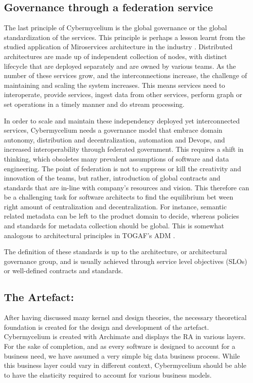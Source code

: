 \documentclass[review]{elsarticle}
\begin{document}
\subsection{Governance through a federation service}

The last principle of Cybermycelium is the global governance or the global standardization of the services. This principle is perhaps a lesson learnt from the studied application of Miroservices architecture in the industry \cite{alshuqayran2016systematic}. Distributed architectures are made up of independent collection of nodes, with distinct lifecycle that are deployed separately and are owned by various teams. As the number of these services grow, and the interconnections increase, the challenge of maintaining and scaling the system increases. This means services need to interoperate, provide services, ingest data from other services, perform graph or set operations in a timely manner and do stream processing. 

In order to scale and maintain these independency deployed yet interconnected services, Cybermycelium needs a governance model that embrace domain autonomy, distribution and decentralization, automation and Devops, and increased interoperability through federated government. This requires a shift in thinking, which obsoletes many prevalent assumptions of software and data engineering. The point of federation is not to suppress or kill the creativity and innovation of the teams, but rather, introduction of global contracts and standards that are in-line with company's resources and vision. This therefore can be a challenging task for software architects to find the  equilibrium bet ween right amount of centralization and decentralization. For instance, semantic related metadata can be left to the product domain to decide, whereas policies and standards for metadata collection should be global. This is somewhat analogous to architectural principles in TOGAF's ADM \cite{josey2016togaf}.

The definition of these standards is up to the architecture, or architectural governance group, and is usually achieved through service level objectives (SLOs) or well-defined contracts and standards.


\subsection{The Artefact:}

After having discussed many kernel and design theories, the necessary theoretical foundation is created for the design and development of the artefact. Cybermycelium is created with Archimate and displays the RA in various layers. For the sake of completion, and as every software is designed to account for a business need, we have assumed a very simple big data business process. While this business layer could vary in different context, Cybermycelium should be able to have the elasticity required to account for various business models. 
\end{document}

